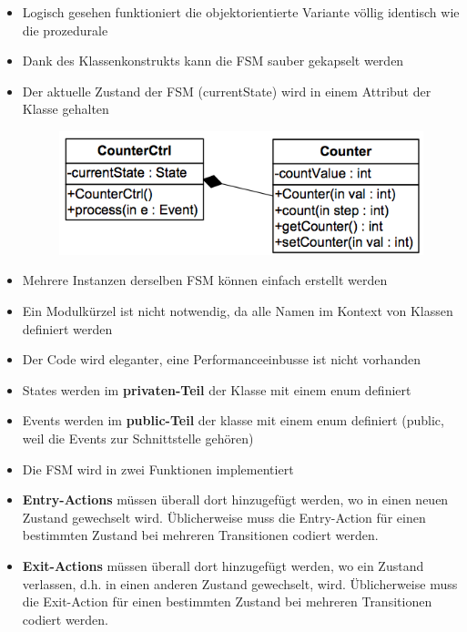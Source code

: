 \begin{itemize}
  \item Logisch gesehen funktioniert die objektorientierte Variante völlig
  identisch wie die prozedurale
  \item Dank des Klassenkonstrukts kann die FSM sauber gekapselt werden
  \item Der aktuelle Zustand der FSM (currentState) wird in einem Attribut der
  Klasse gehalten
  \begin{figure}[h]
    \centering
    \includegraphics[scale = 0.5]{images/FSM/klasseCounter}  
  \end{figure}
  \item Mehrere Instanzen derselben FSM können einfach erstellt werden
  \item Ein Modulkürzel ist nicht notwendig, da alle Namen im Kontext von
  Klassen definiert werden
  \item Der Code wird eleganter, eine Performanceeinbusse ist nicht vorhanden
  \item States werden im \textbf{privaten-Teil} der Klasse mit einem enum
  definiert
  

\item Events werden im \textbf{public-Teil} der klasse mit einem enum definiert
(public, weil die Events zur Schnittstelle gehören)


\item Die FSM wird in zwei Funktionen implementiert


\item \textbf{Entry-Actions} müssen überall dort hinzugefügt werden, wo in einen
neuen Zustand gewechselt wird. Üblicherweise muss die Entry-Action für einen
bestimmten Zustand bei mehreren Transitionen codiert werden.
\item \textbf{Exit-Actions} müssen überall dort hinzugefügt werden, wo ein
Zustand verlassen, d.h. in einen anderen Zustand gewechselt, wird. Üblicherweise
muss die Exit-Action für einen bestimmten Zustand bei mehreren Transitionen
codiert werden.
\end{itemize}

